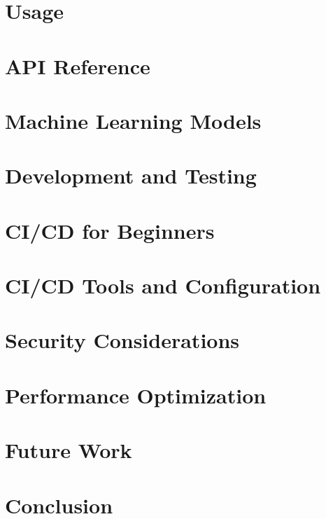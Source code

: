 \documentclass[conference]{IEEEtran}
\begin{document}
\section{Usage}


\section{API Reference}


\section{Machine Learning Models}


\section{Development and Testing}


\section{CI/CD for Beginners}


\section{CI/CD Tools and Configuration}


\section{Security Considerations}


\section{Performance Optimization}


\section{Future Work}


\section{Conclusion}




\end{document}
